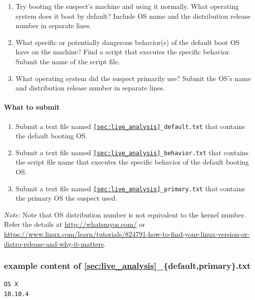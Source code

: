 \documentclass[letterpaper,12pt]{report}
\begin{document}
\begin{enumerate}
\item Try booting the suspect's machine and using it normally. What operating system does it boot by default? Include OS name and the distribution release number in separate lines. 
\item What specific or potentially dangerous behavior(s) of the default boot OS have on the machine? Find a script that executes the specific behavior. Submit the name of the script file.
\item What operating system did the suspect primarily use? Submit the OS's name and distribution release number in separate lines.
\end{enumerate}

\paragraph{What to submit}
\begin{enumerate}
\item Submit a text file named \texttt{\ref{sec:live_analysis}\_default.txt} that contains the default booting OS.
\item Submit a text file named \texttt{\ref{sec:live_analysis}\_behavior.txt} that contains the script file name that executes the specific behavior of the default booting OS.
\item Submit a text file named \texttt{\ref{sec:live_analysis}\_primary.txt} that contains the primary OS the suspect used.
\end{enumerate}

\medskip
\begin{sloppypar}
\textit{Note:} Note that OS distribution number is not equivalent to the kernel number. Refer the details at \url{http://whatsmyos.com/} or \url{https://www.linux.com/learn/tutorials/824791-how-to-find-your-linux-version-or-distro-release-and-why-it-matters}.
\end{sloppypar}

\subsubsection*{example content of {\ref{sec:live_analysis}\_\{default,primary\}.txt}}
\begin{mdframed}
\begin{Verbatim}
OS X
10.10.4
\end{Verbatim}
\end{mdframed}
\end{document}
